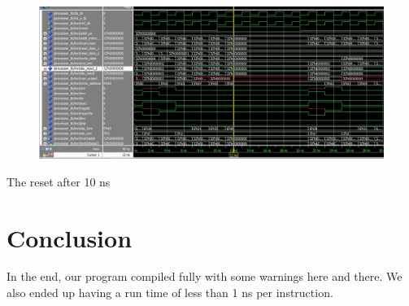\documentclass[paper=letter, fontsize=11pt]{scrartcl} %
\numberwithin{equation}{section}
\numberwithin{figure}{section}
\numberwithin{table}{section}
\begin{document}
\begin{figure}[H]
	\centering
		\includegraphics[width=150mm]{../sim/photo/reset.JPG}
	\label{fig:Reset}
\end{figure}

The reset after 10 ns



\section{Conclusion}
In the end, our program compiled fully with some warnings here and there. We also ended up having a run time of less than 1 ns per instruction.
\end{document}
